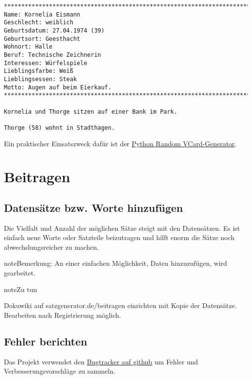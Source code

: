\documentclass[a4paper,12pt,oneside]{sphinxmanual}
\begin{document}
\begin{Verbatim}[commandchars=\\\{\}]
********************************************************************************
Name: Kornelia Eismann
Geschlecht: weiblich
Geburtsdatum: 27.04.1974 (39)
Geburtsort: Geesthacht
Wohnort: Halle
Beruf: Technische Zeichnerin
Interessen: Würfelspiele
Lieblingsfarbe: Weiß
Lieblingsessen: Steak
Motto: Augen auf beim Eierkauf.
********************************************************************************

Kornelia und Thorge sitzen auf einer Bank im Park.

Thorge (58) wohnt in Stadthagen.
\end{Verbatim}

Ein praktischer Einsatszweck dafür ist der \href{https://github.com/davidak/python-random-vcard-generator}{Python Random VCard-Generator}.


\chapter{Beitragen}
\label{beitragen:beitragen}\label{beitragen::doc}

\section{Datensätze bzw. Worte hinzufügen}
\label{beitragen:datensatze-bzw-worte-hinzufugen}
Die Vielfalt und Anzahl der möglichen Sätze steigt mit den Datensätzen. Es ist einfach neue Worte oder Satzteile beizutragen und hilft enorm die Sätze noch abwechslungsreicher zu machen.

\begin{notice}{note}{Bemerkung:}
An einer einfachen Möglichkeit, Daten hinzuzufügen, wird gearbeitet.
\end{notice}

\begin{notice}{note}{Zu tun}

Dokuwiki auf satzgenerator.de/beitragen einrichten mit Kopie der Datensätze. Bearbeiten nach Registrierung möglich.
\end{notice}


\section{Fehler berichten}
\label{beitragen:fehler-berichten}
Das Projekt verwendet den \href{https://github.com/davidak/pyzufall/issues/}{Bugtracker auf github} um Fehler und Verbesserungsvorschläge zu sammeln.
\end{document}

